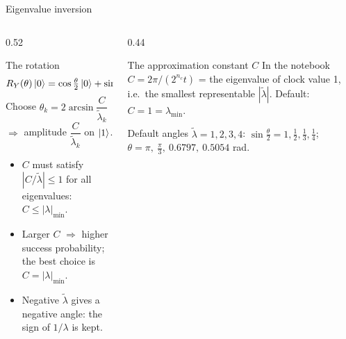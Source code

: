\documentclass[aspectratio=169,11pt]{beamer}
\newcommand{\lt}{\tilde\lambda}
\begin{document}
\begin{frame}{Eigenvalue inversion}
  \begin{columns}[T]
    \begin{column}{0.52\textwidth}
      \begin{block}{The rotation}
        \[ R_Y(\theta)\ket0 = \cos\tfrac\theta2\ket0 + \sin\tfrac\theta2\ket1 \]
        Choose $\theta_k = 2\arcsin\dfrac{C}{\lt_k}$ $\Rightarrow$ amplitude $\dfrac{C}{\lt_k}$ on $\ket1$.
      \end{block}
      \small
      \begin{itemize}
        \item $C$ must satisfy $|C/\lt| \le 1$ for all eigenvalues: $C \le |\lambda|_{\min}$.
        \item Larger $C$ $\Rightarrow$ higher success probability; the best choice is $C = |\lambda|_{\min}$.
        \item Negative $\lt$ gives a negative angle: the sign of $1/\lambda$ is kept.
      \end{itemize}
    \end{column}
    \begin{column}{0.44\textwidth}
      \begin{block}{The approximation constant $C$}
        In the notebook $C = 2\pi/(2^{n_c}t)$ = the eigenvalue of clock value 1, i.e.\ the smallest representable $|\lt|$.
        Default: $C = 1 = \lambda_{\min}$.
      \end{block}
      \begin{exampleblock}{Default angles}
        \footnotesize $\lt = 1, 2, 3, 4$: $\sin\frac\theta2 = 1, \frac12, \frac13, \frac14$;
        $\theta = \pi,\ \frac\pi3,\ 0.6797,\ 0.5054$ rad.
      \end{exampleblock}
    \end{column}
  \end{columns}
\end{frame}
\end{document}
